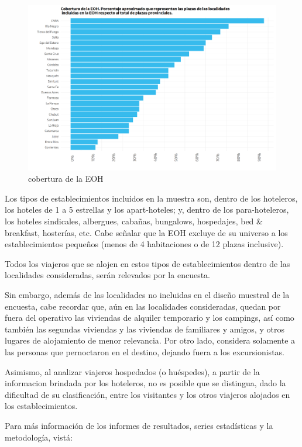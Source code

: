 \documentclass[
]{book}
\begin{document}
\begin{figure}

{\centering \includegraphics[width=0.8\linewidth]{imagenes/figura2.2} 

}

\caption{cobertura de la EOH}\label{fig:cobertura}
\end{figure}

Los tipos de establecimientos incluidos en la muestra son, dentro de los hoteleros, los hoteles de 1 a 5 estrellas y los apart-hoteles; y, dentro de los para-hoteleros, los hoteles sindicales, albergues, cabañas, bungalows, hospedajes, bed \& breakfast, hosterías, etc.
Cabe señalar que la EOH excluye de su universo a los establecimientos pequeños (menos de 4 habitaciones o de 12 plazas inclusive).

Todos los viajeros que se alojen en estos tipos de establecimientos dentro de las localidades consideradas, serán relevados por la encuesta.

Sin embargo, además de las localidades no incluidas en el diseño muestral de la encuesta, cabe recordar que, aún en las localidades consideradas, quedan por fuera del operativo las viviendas de alquiler temporario y los campings, así como también las segundas viviendas y las viviendas de familiares y amigos, y otros lugares de alojamiento de menor relevancia.
Por otro lado, considera solamente a las personas que pernoctaron en el destino, dejando fuera a los excursionistas.

Asimismo, al analizar viajeros hospedados (o huéspedes), a partir de la informacion brindada por los hoteleros, no es posible que se distingua, dado la dificultad de su clasificación, entre los visitantes y los otros viajeros alojados en los establecimientos.

Para más información de los informes de resultados, series estadísticas y la metodología, vistá:
\end{document}
